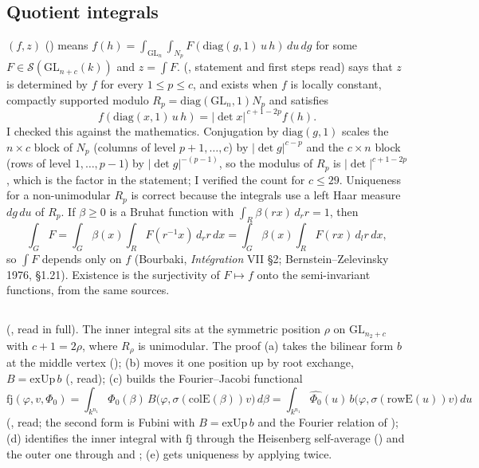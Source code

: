 \documentclass[11pt]{article}
\newcommand{\GL}{\mathrm{GL}}
\newcommand{\Sch}{\mathcal S}
\begin{document}
\subsection{Quotient integrals}

$(f,z)$ () means $f(h)=\int_{\GL_n}\int_{N_p}F(\mathrm{diag}(g,1)\,u\,h)\,du\,dg$ for some $F\in\Sch(\GL_{n+c}(k))$ and $z=\int F$.  (, statement and first steps read) says that $z$ is determined by $f$ for every $1\le p\le c$, and exists when $f$ is locally constant, compactly supported modulo $R_p=\mathrm{diag}(\GL_n,1)N_p$ and satisfies
\[
f(\mathrm{diag}(x,1)\,u\,h)=\lvert\det x\rvert^{\,c+1-2p}f(h).
\]
I checked this against the mathematics. Conjugation by $\mathrm{diag}(g,1)$ scales the $n\times c$ block of $N_p$ (columns of level $p+1,\dots,c$) by $\lvert\det g\rvert^{c-p}$ and the $c\times n$ block (rows of level $1,\dots,p-1$) by $\lvert\det g\rvert^{-(p-1)}$, so the modulus of $R_p$ is $\lvert\det\rvert^{c+1-2p}$, which is the factor in the statement; I verified the count for $c\le29$. Uniqueness for a non-unimodular $R_p$ is correct because the integrals use a left Haar measure $dg\,du$ of $R_p$. If $\beta\ge0$ is a Bruhat function with $\int_{R}\beta(rx)\,d_rr=1$, then
\[
\int_GF=\int_G\beta(x)\int_RF(r^{-1}x)\,d_rr\,dx=\int_G\beta(x)\int_RF(rx)\,d_lr\,dx,
\]
so $\int F$ depends only on $f$ (Bourbaki, \emph{Int\'egration} VII \S2; Bernstein--Zelevinsky 1976, \S1.21). Existence is the surjectivity of $F\mapsto f$ onto the semi-invariant functions, from the same sources.

\subsection{}

 (, read in full). The inner integral sits at the symmetric position $\rho$ on $\GL_{n_2+c}$ with $c+1=2\rho$, where $R_\rho$ is unimodular. The proof (a) takes the bilinear form $b$ at the middle vertex (); (b) moves it one position up by root exchange, $B=\mathrm{exUp}\,b$ (, read); (c) builds the Fourier--Jacobi functional
\[
\mathrm{fj}(\varphi,v,\Phi_0)=\int_{k^{n_1}}\Phi_0(\beta)\,B\bigl(\varphi,\sigma(\mathrm{colE}(\beta))v\bigr)\,d\beta
=\int_{k^{n_1}}\widehat{\Phi_0}(u)\,b\bigl(\varphi,\sigma(\mathrm{rowE}(u))v\bigr)\,du
\]
(, read; the second form is Fubini with $B=\mathrm{exUp}\,b$ and the Fourier relation of ); (d) identifies the inner integral with $\mathrm{fj}$ through the Heisenberg self-average () and the outer one through  and ; (e) gets uniqueness by applying  twice.
\end{document}
